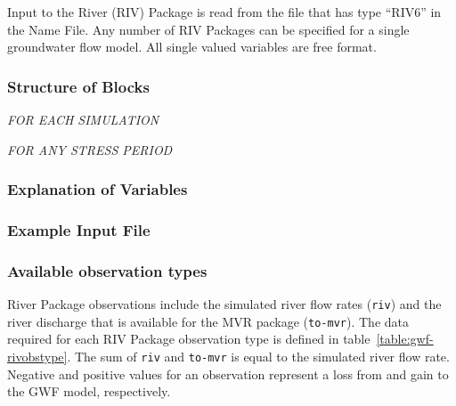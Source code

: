 Input to the River (RIV) Package is read from the file that has type ``RIV6'' in the Name File.  Any number of RIV Packages can be specified for a single groundwater flow model.  All single valued variables are free format.

\vspace{5mm}
\subsubsection{Structure of Blocks}
\vspace{5mm}

\noindent \textit{FOR EACH SIMULATION}


\vspace{5mm}
\noindent \textit{FOR ANY STRESS PERIOD}


\vspace{5mm}
\subsubsection{Explanation of Variables}
\begin{description}

\end{description}

\vspace{5mm}
\subsubsection{Example Input File}


\vspace{5mm}
\subsubsection{Available observation types}
River Package observations include the simulated river flow rates (\texttt{riv}) and the river discharge that is available for the MVR package (\texttt{to-mvr}). The data required for each RIV Package observation type is defined in table~\ref{table:gwf-rivobstype}. The sum of \texttt{riv} and \texttt{to-mvr} is equal to the simulated river flow rate. Negative and positive values for an observation represent a loss from and gain to the GWF model, respectively.

